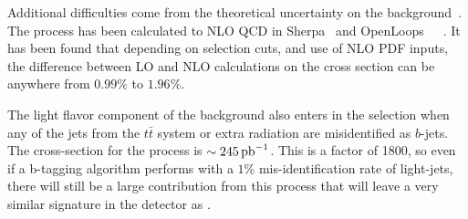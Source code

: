 \par Additional difficulties come from the theoretical uncertainty on
the \ttbb background~\cite{th:HiggsXS_2013}.  The process has been
calculated to NLO QCD in Sherpa~\cite{tthXS_sherpa_Gleisberg} and
OpenLoops~\cite{ttbbXS_openloops_Cascioli}~\cite{ttbbXS_openloops_help1_Krauss}~\cite{ttbbXS_openloops_help2_Gleisberg}.
It has been found that depending on selection cuts, and use of NLO PDF
inputs, the difference between LO and NLO calculations on the cross
section can be anywhere from $0.99\%$ to $1.96\%$.  

\par The light flavor component of the \ttjets background also enters
in the selection when any of the jets from the $t\bar{t}$ system or
extra radiation are misidentified as $b$-jets.  The cross-section for
the \ttjets process is $\sim245\mbox{\ensuremath{\,\text{pb}^\text{$-$1}}}$.  This is a factor of 1800, so
even if a b-tagging algorithm performs with a $1\%$ mis-identification
rate of light-jets, there will still be a large contribution from this
process that will leave a very similar signature in the detector as
\ttH. 

